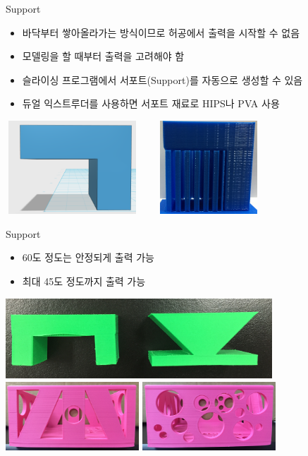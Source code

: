 \documentclass[11pt]{beamer}
\begin{document}
\begin{frame}[t]{Support}\footnotesize
\begin{itemize}
\item 바닥부터 쌓아올라가는 방식이므로 허공에서 출력을 시작할 수 없음
\item 모델링을 할 때부터 출력을 고려해야 함
\item 슬라이싱 프로그램에서 서포트(Support)를 자동으로 생성할 수 있음
\item 듀얼 익스트루더를 사용하면 서포트 재료로 HIPS나 PVA 사용
\end{itemize}
\includegraphics[width=5cm, height=3.5cm]{./image/12_01.png} \@ \includegraphics[width=5cm, height=3.5cm]{./image/12_02.jpg}
\end{frame}

\begin{frame}[t]{Support}\footnotesize
\begin{itemize}
\item 60도 정도는 안정되게 출력 가능
\item 최대 45도 정도까지 출력 가능
\end{itemize}
\includegraphics[width=10cm]{./image/12_03.jpg}\\
\includegraphics[width=5cm]{./image/12_04.jpg} \@ \includegraphics[width=5cm]{./image/12_05.jpg}
\end{frame}
\end{document}
